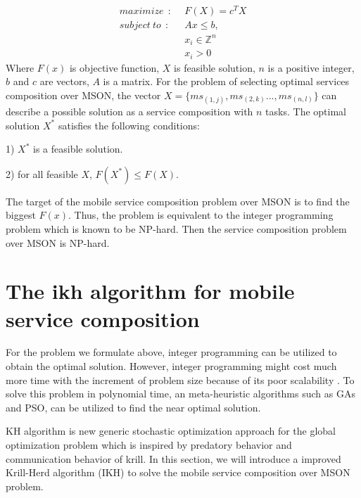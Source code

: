 \documentclass[10pt,journal,compsoc]{IEEEtran}
\begin{document}
\begin{align}
maximize     \ \ : \ \ & F(X) = c^{T}X     \\\nonumber
subject\ to  \ \ : \ \ & Ax \le b, \\\nonumber
               	       & x_i \in \mathbb{Z}^{n} \\\nonumber
                       & x_i > 0 
\end{align}
Where $F(x)$ is objective function, $X$ is feasible solution, $n$ is a positive integer, $b$ and $c$ are vectors, $A$ is a matrix.
For the problem of selecting optimal services composition over MSON, the vector $X = \{ms_{(1,j)}, ms_{(2,k)}. . . , ms_{(n,l)}\}$ can describe a possible solution as a service composition with $n$ tasks. 
The optimal solution  $X^*$ satisfies the following conditions:

1) $X^*$ is a feasible solution.

​2) for all feasible $X$, $F(X^*) \le F(X)$. 

The target of the mobile service composition problem over MSON is to find the biggest $F(x)$. Thus, the problem is equivalent to the integer programming problem which is known to be NP-hard. Then the service composition problem over MSON is NP-hard.

\section{The ikh algorithm for mobile service composition}
For the problem we formulate above, integer programming can be utilized to obtain the optimal solution. However, integer programming might cost much more time with the increment of problem size because of its poor scalability \cite{nemhauser1988integer}. To solve this problem in polynomial time, an meta-heuristic algorithms such as GAs and PSO, can be utilized to find the near optimal solution.

KH algorithm \cite{gandomi2012krill} is new generic stochastic optimization approach for the global optimization problem which is inspired by predatory behavior and communication behavior of krill. 
In this section, we will introduce a improved Krill-Herd algorithm (IKH) to solve the mobile service composition over MSON problem.
\end{document}
